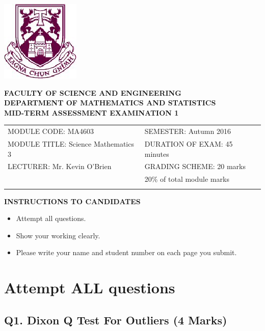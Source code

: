 \documentclass[a4paper,12pt]{article}
\begin{document}
\begin{center}
	\includegraphics[scale=0.60]{images/shieldtransparent2}
\end{center}

\begin{center}
	\vspace{1cm}
	\large \bf {FACULTY OF SCIENCE AND ENGINEERING} \\[0.5cm]
	\normalsize DEPARTMENT OF MATHEMATICS AND STATISTICS \\[1.25cm]
	\large \bf {MID-TERM ASSESSMENT EXAMINATION 1} \\[1.5cm]
\end{center}

\begin{tabular}{ll}
	MODULE CODE: MA4603 & SEMESTER: Autumn 2016\\[1cm]
	MODULE TITLE: Science Mathematics 3  & DURATION OF EXAM: 45 minutes \\[1cm]
	LECTURER: Mr. Kevin O'Brien & GRADING SCHEME: 20 marks \\
	& \phantom{GRadiC} \footnotesize {20\% of total module marks} \\[0.2cm]
	\\[1cm]
\end{tabular}
\begin{center}
	{\bf INSTRUCTIONS TO CANDIDATES}
\end{center}
\begin{itemize}
	\item Attempt all questions.
	\item Show your working clearly.
	\item Please write your name and student number on each page you submit.

\end{itemize}
\newpage
\section*{Attempt ALL questions}


\subsection*{Q1. Dixon Q Test For Outliers (4 Marks)}
\end{document}
